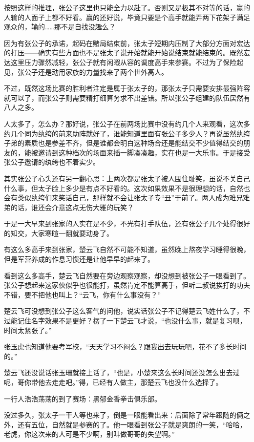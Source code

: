 按照这样的推理，张公子这里也只能全力以赴了。否则又是极其不对等的话，赢的人输的人面子上都不好看。赢的还好说，毕竟只要是个高手就能弄两下花架子满足观众的，输的……那不是自找没趣么？

因为有张公子的承诺，起码在赌局结束前，张太子短期内压制了大部分方面对宏达的打压——确实有些方面也不是张太子说开始就能开始说结束就能结束的。既然宏达这里压力骤然减轻，张公子就有闲暇从容的调度高手来参赛。不过为了保险起见，张公子还是动用家族的力量找来了两个世外高人。

不过，既然这场比赛的胜利者注定是属于张太子的，那张太子只需要安排最强阵容就可以了，而张公子则需要精打细算务求不出差错。所以张公子组建的队伍居然有八人之多。

人太多了，怎么办？那好说，张公子在前两场比赛中没有约几个人来观看，这次多约几个同为纨绔的前来助阵就好了，谁能知道里面有张公子多少人？再说虽然纨绔子弟的素质也是参差不齐，但是谁都会明白这种场合还是能结交不少值得结交的朋友的，能被邀请到这种档次的场面来插一脚凑凑趣，实在也是一大乐事。于是接受张公子邀请的纨绔也不着实少。

其实张公子心头还有另一翻心思：上两次都是张太子被人围住耻笑，虽说不关自己什么事，但太子脸上多少是有点不好看的。这次如果效果不是很理想的话，自然也会有类似纨绔们来笑话自己，那样就不会让张太子专“丑”于前了。两人成为难兄难弟的话，谁还会介意这点无伤大雅的玩笑？

于是一大早来到张家的人实在是不少，不光有打手队伍，还有张公子几个处得很好的知交，大家寒暄一翻就要动身了。

有这么多高手来到张家，楚云飞自然不可能不知道，虽然晚上熬夜学习睡得很晚，但是军营养成的作息习惯还是让他早早的起来了。

看到这么多高手，楚云飞自然要在旁边观察观察，却没想到被张公子一眼看到了。张公子想起来这家伙似乎也很能打，虽然肯定不能算高手，但听二叔说挨打的功夫不错，要不把他也叫上？“云飞，你有什么事没有？”

楚云飞可没想到张公子这么客气的问他，说实话张公子不记得楚云飞姓什么了，不过能记住名字效果不是更好？楞了一下楚云飞才说，“也没什么事，就是复习呗，时间太紧张了。”

张玉虎也知道他要考军校，“天天学习不闷么？跟我出去玩玩吧，花不了多长时间的。”

楚云飞还没说话张玉珊就接上话了，“也是，小楚来这么长时间还没怎么出去过呢，哥你带他去走走吧。”得，已经有人做主，那楚云飞也没什么选择了。

一行人浩浩荡荡的到了赛场：黑郁金香拳击俱乐部。

没过多久，张太子一干人等也来了，倒是一眼能看出来：后面除了常年跟随的俩之外，还有五位，自然就是参赛的了。他一眼看到张公子就是爽朗的一笑，“哈哈，老虎，你这次来的人可是不少啊，别叫做哥哥的失望啊。”


